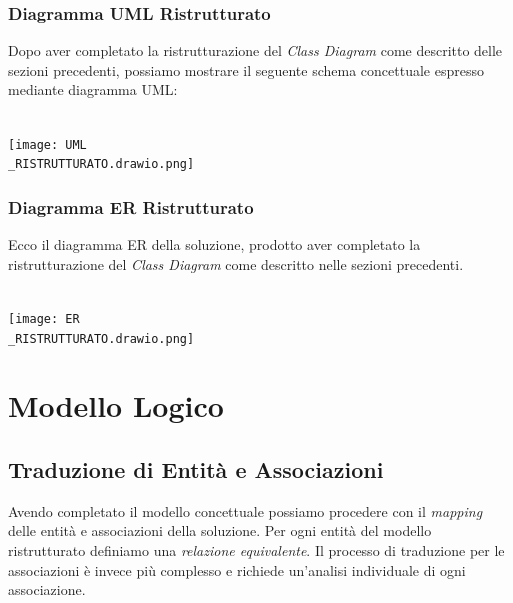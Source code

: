 \documentclass{article}
\begin{document}
	\subsubsection{Diagramma UML Ristrutturato}
	Dopo aver completato la ristrutturazione del \textit{Class Diagram} come descritto delle sezioni precedenti, possiamo mostrare il seguente schema concettuale espresso mediante diagramma UML:
	\\\\
	
	\begin{center}
		\texttt{[image: UML\\\_RISTRUTTURATO.drawio.png]}
	\end{center}
	
	
	\newpage
	
	
	\subsubsection{Diagramma ER Ristrutturato}
	Ecco il diagramma ER della soluzione, prodotto aver completato la ristrutturazione del \textit{Class Diagram} come descritto nelle sezioni precedenti.
	\\\\
	
	\begin{center}
		\texttt{[image: ER\\\_RISTRUTTURATO.drawio.png]}
	\end{center}
	
	
	\newpage
	
	
	\section{Modello Logico}
	
	\subsection{Traduzione di Entit\`a e Associazioni}
	Avendo completato il modello concettuale possiamo procedere con il \textit{mapping} delle entit\`a e associazioni della soluzione. Per ogni entit\`a del modello ristrutturato definiamo una \textit{relazione equivalente}. Il processo di traduzione per le associazioni \`e invece pi\`u complesso e richiede un’analisi individuale di ogni associazione.
	
\end{document}
